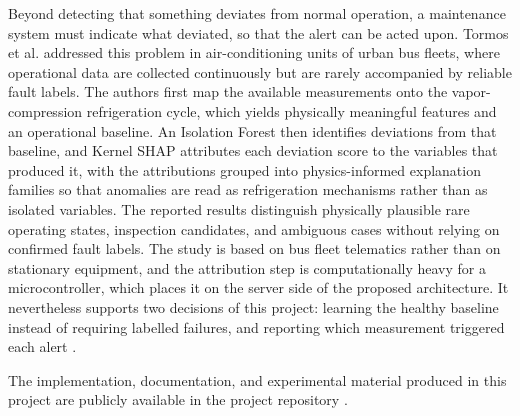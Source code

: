 \documentclass[english,hidelinks]{sbrt}
\begin{document}
Beyond detecting that something deviates from normal operation, a maintenance system must indicate what deviated, so that the alert can be acted upon. Tormos et al. addressed this problem in air-conditioning units of urban bus fleets, where operational data are collected continuously but are rarely accompanied by reliable fault labels. The authors first map the available measurements onto the vapor-compression refrigeration cycle, which yields physically meaningful features and an operational baseline. An Isolation Forest then identifies deviations from that baseline, and Kernel SHAP attributes each deviation score to the variables that produced it, with the attributions grouped into physics-informed explanation families so that anomalies are read as refrigeration mechanisms rather than as isolated variables. The reported results distinguish physically plausible rare operating states, inspection candidates, and ambiguous cases without relying on confirmed fault labels. The study is based on bus fleet telematics rather than on stationary equipment, and the attribution step is computationally heavy for a microcontroller, which places it on the server side of the proposed architecture. It nevertheless supports two decisions of this project: learning the healthy baseline instead of requiring labelled failures, and reporting which measurement triggered each alert \cite{tormos2026hvacxai}.

The implementation, documentation, and experimental material produced in this project are publicly available in the project repository \cite{repo}.
\end{document}
